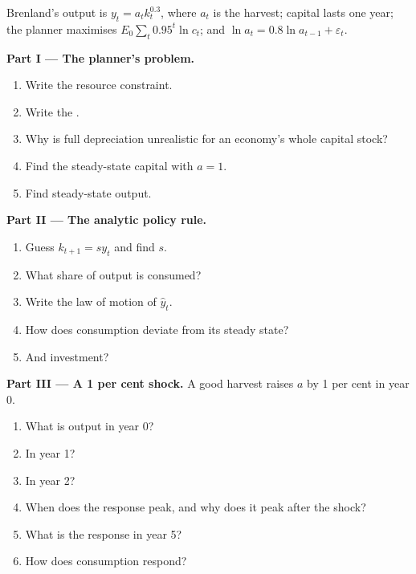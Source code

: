 \begin{problem}
\label{pb:b2:business-cycles:1}
Brenland's output is $y_t = a_tk_t^{0.3}$, where $a_t$ is the harvest; capital lasts one year; the planner maximises $E_0\sum_t 0.95^t\ln c_t$; and $\ln a_t = 0.8\ln a_{t-1} + \varepsilon_t$.

\medskip
\noindent\textbf{Part I --- The planner's problem.}
\begin{enumerate}
  \item Write the resource constraint.
  \item Write the .
  \item Why is full depreciation unrealistic for an economy's whole capital stock?
  \item Find the steady-state capital with $a = 1$.
  \item Find steady-state output.
\end{enumerate}

\medskip
\noindent\textbf{Part II --- The analytic policy rule.}
\begin{enumerate}[resume]
  \item Guess $k_{t+1} = sy_t$ and find $s$.
  \item What share of output is consumed?
  \item Write the law of motion of $\hat y_t$.
  \item How does consumption deviate from its steady state?
  \item And investment?
\end{enumerate}

\medskip
\noindent\textbf{Part III --- A 1 per cent shock.} A good harvest raises $a$ by 1 per cent in year 0.
\begin{enumerate}[resume]
  \item What is output in year 0?
  \item In year 1?
  \item In year 2?
  \item When does the response peak, and why does it peak after the shock?
  \item What is the response in year 5?
  \item How does consumption respond?
\end{enumerate}


\end{problem}
